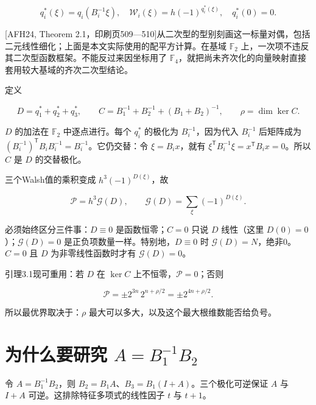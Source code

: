 \documentclass[UTF8,fontset=fandol,zihao=-4,openany,oneside]{ctexbook}
\begin{document}
\[
q_i^*(\xi)=q_i(B_i^{-1}\xi),\quad
\mathcal W_i(\xi)=h(-1)^{q_i^*(\xi)},\quad q_i^*(0)=0.
\tag{英文(3.3)}
\]



[AFH24, Theorem 2.1，印刷页509—510]从二次型的型别刻画这一标量对偶，包括二元线性细化；上面是本文实际使用的配平方计算。在基域 \(\mathbb F_2\) 上，一次项不违反其二次型函数框架。不能反过来因坐标用了 \(\mathbb F_4\)，就把尚未齐次化的向量映射直接套用较大基域的齐次二次型结论。



定义



\[
D=q_1^*+q_2^*+q_3^*,\qquad
C=B_1^{-1}+B_2^{-1}+(B_1+B_2)^{-1},\qquad
\rho=\dim\ker C.
\tag{英文(3.4)}
\]



\(D\) 的加法在 \(\mathbb F_2\) 中逐点进行。每个 \(q_i^*\) 的极化为 \(B_i^{-1}\)，因为代入 \(B_i^{-1}\) 后矩阵成为 \((B_i^{-1})^{\mathsf T}B_iB_i^{-1}=B_i^{-1}\)。它仍交替：令 \(\xi=B_ix\)，就有 \(\xi^{\mathsf T}B_i^{-1}\xi=x^{\mathsf T}B_ix=0\)。所以 \(C\) 是 \(D\) 的交替极化。



三个Walsh值的乘积变成 \(h^3(-1)^{D(\xi)}\)，故



\[
\mathcal P=h^3\mathcal G(D),\qquad
\mathcal G(D)=\sum_\xi(-1)^{D(\xi)}.\tag{英文(3.5)}
\]



必须始终区分三件事：\(D\equiv0\) 是函数恒零；\(C=0\) 只说 \(D\) 线性（这里 \(D(0)=0\)）；\(\mathcal G(D)=0\) 是正负项数量一样。特别地，\(D\equiv0\) 时 \(\mathcal G(D)=N\)，绝非0。\(C=0\) 且 \(D\) 为非零线性函数时才有 \(\mathcal G(D)=0\)。



引理3.1现可重用：若 \(D\) 在 \(\ker C\) 上不恒零，\(\mathcal P=0\)；否则



\[
\mathcal P=\pm2^{3n}\,2^{n+\rho/2}=\pm2^{4n+\rho/2}.
\]



所以最优界取决于：\(\rho\) 最大可以多大，以及这个最大根维数能否给负号。



\section{为什么要研究 \texorpdfstring{\(A=B_1^{-1}B_2\)}{A=B1-1B2}}


令 \(A=B_1^{-1}B_2\)，则 \(B_2=B_1A\)、\(B_3=B_1(I+A)\)。三个极化可逆保证 \(A\) 与 \(I+A\) 可逆。这排除特征多项式的线性因子 \(t\) 与 \(t+1\)。
\end{document}
